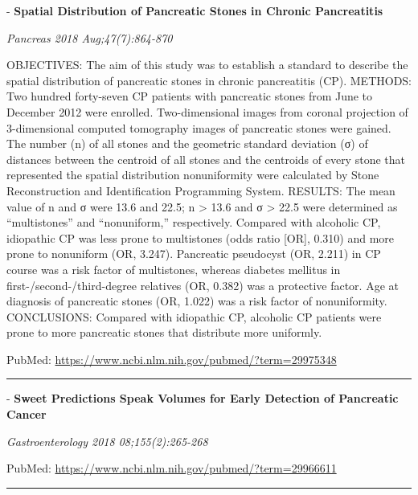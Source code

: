 \documentclass[]{article}
\begin{document}
 - \textbf{Spatial Distribution of Pancreatic Stones in Chronic
Pancreatitis}

\emph{Pancreas 2018 Aug;47(7):864-870}

OBJECTIVES: The aim of this study was to establish a standard to
describe the spatial distribution of pancreatic stones in chronic
pancreatitis (CP). METHODS: Two hundred forty-seven CP patients with
pancreatic stones from June to December 2012 were enrolled.
Two-dimensional images from coronal projection of 3-dimensional computed
tomography images of pancreatic stones were gained. The number (n) of
all stones and the geometric standard deviation (σ) of distances between
the centroid of all stones and the centroids of every stone that
represented the spatial distribution nonuniformity were calculated by
Stone Reconstruction and Identification Programming System. RESULTS: The
mean value of n and σ were 13.6 and 22.5; n \textgreater{} 13.6 and σ
\textgreater{} 22.5 were determined as ``multistones'' and
``nonuniform,'' respectively. Compared with alcoholic CP, idiopathic CP
was less prone to multistones (odds ratio {[}OR{]}, 0.310) and more
prone to nonuniform (OR, 3.247). Pancreatic pseudocyst (OR, 2.211) in CP
course was a risk factor of multistones, whereas diabetes mellitus in
first-/second-/third-degree relatives (OR, 0.382) was a protective
factor. Age at diagnosis of pancreatic stones (OR, 1.022) was a risk
factor of nonuniformity. CONCLUSIONS: Compared with idiopathic CP,
alcoholic CP patients were prone to more pancreatic stones that
distribute more uniformly.

PubMed: \url{https://www.ncbi.nlm.nih.gov/pubmed/?term=29975348}

{}

{}

\begin{center}\rule{0.5\linewidth}{\linethickness}\end{center}

 - \textbf{Sweet Predictions Speak Volumes for Early Detection of
Pancreatic Cancer}

\emph{Gastroenterology 2018 08;155(2):265-268}

PubMed: \url{https://www.ncbi.nlm.nih.gov/pubmed/?term=29966611}

{}

{}

\begin{center}\rule{0.5\linewidth}{\linethickness}\end{center}
\end{document}
